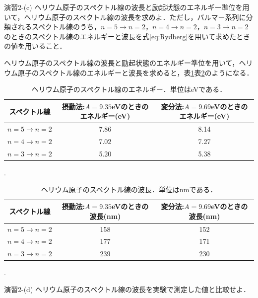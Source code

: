 \documentclass[a4paper,dvipdfmx,10.5pt]{jarticle}
\begin{document}
\begin{itembox}[l]{演習2-(c)}
  ヘリウム原子のスペクトル線の波長と励起状態のエネルギー準位を用いて，ヘリウム原子のスペクトル線の波長を求めよ．ただし，バルマー系列に分類されるスペクトル線のうち，$n=5\to n=2$，$n=4\to n=2$，$n=3\to n=2$のときのスペクトル線のエネルギーと波長を式\eqref{eq:Rydberg}を用いて求めたときの値を用いること．
\end{itembox}
\quad ヘリウム原子のスペクトル線の波長と励起状態のエネルギー準位を用いて，ヘリウム原子のスペクトル線のエネルギーと波長を求めると，表\ref{tab:He_spectrum_energy}表\ref{tab:He_spectrum_wavelength}のようになる．
\begin{table}[htbp]
  \begin{center}
    \begin{tabular}{|c|c|c|}
       \hline
    スペクトル線 & 摂動法:$A=9.35$eVのときのエネルギー(eV) & 変分法:$A=9.69$eVのときのエネルギー(eV) \\
      \hline
    $n=5\to n=2$ & 7.86 & 8.14\\
    $n=4\to n=2$ & 7.02 & 7.27\\
    $n=3\to n=2$ & 5.20 & 5.38\\
    \hline
    \end{tabular}
    \caption{ヘリウム原子のスペクトル線のエネルギー．単位はeVである．}
    .\label{tab:He_spectrum_energy}
  \end{center}
\end{table}
\begin{table}[htbp]
  \begin{center}
    \begin{tabular}{|c|c|c|}
       \hline
    スペクトル線 & 摂動法:$A=9.35$eVのときの波長(nm) & 変分法:$A=9.69$eVのときの波長(nm) \\
      \hline
    $n=5\to n=2$ & 158 & 152\\
    $n=4\to n=2$ & 177 & 171\\
    $n=3\to n=2$ & 239 & 230\\
    \hline
    \end{tabular}
    \caption{ヘリウム原子のスペクトル線の波長．単位はnmである．}
    .\label{tab:He_spectrum_wavelength}
  \end{center}
\end{table}
\begin{itembox}[l]{演習2-(d)}
  ヘリウム原子のスペクトル線の波長を実験で測定した値と比較せよ．
\end{itembox}
\end{document}
